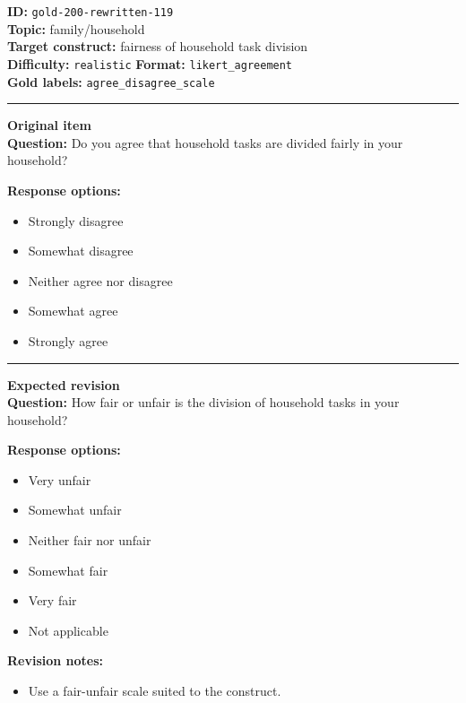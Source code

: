 \documentclass[10pt,a4paper]{article}
\newcommand{\sectionline}{\vspace{0.15em}\hrule\vspace{0.35em}}
\begin{document}
\begin{tcolorbox}[colframe=FlawRed,colback=white,colbacktitle=FlawRed!9,coltitle=black,title={Item 119\hfill Flawed item}]
\textbf{ID:} \texttt{gold-200-rewritten-119}\\
\textbf{Topic:} family/household\\
\textbf{Target construct:} fairness of household task division\\
\textbf{Difficulty:} \texttt{realistic} \quad \textbf{Format:} \texttt{likert\_agreement}\\
\textbf{Gold labels:} \texttt{agree\_disagree\_scale}\\
\sectionline
\textbf{Original item}\\
\textbf{Question:} Do you agree that household tasks are divided fairly in your household?
\par\textbf{Response options:}
\begin{itemize}
\item Strongly disagree
\item Somewhat disagree
\item Neither agree nor disagree
\item Somewhat agree
\item Strongly agree
\end{itemize}
\sectionline
\textbf{Expected revision}\\
\textbf{Question:} How fair or unfair is the division of household tasks in your household?
\par\textbf{Response options:}
\begin{itemize}
\item Very unfair
\item Somewhat unfair
\item Neither fair nor unfair
\item Somewhat fair
\item Very fair
\item Not applicable
\end{itemize}
\par\textbf{Revision notes:}
\begin{itemize}
\item Use a fair-unfair scale suited to the construct.
\end{itemize}
\end{tcolorbox}
\end{document}
